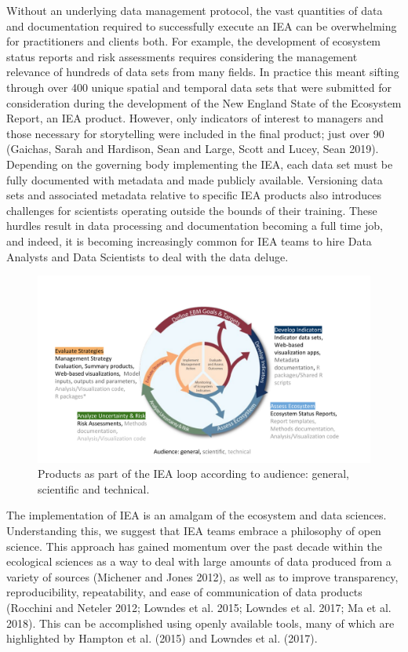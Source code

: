 \documentclass[
]{article}
\begin{document}
Without an underlying data management protocol, the vast quantities of
data and documentation required to successfully execute an IEA can be
overwhelming for practitioners and clients both. For example, the
development of ecosystem status reports and risk assessments requires
considering the management relevance of hundreds of data sets from many
fields. In practice this meant sifting through over 400 unique spatial
and temporal data sets that were submitted for consideration during the
development of the New England State of the Ecosystem Report, an IEA
product. However, only indicators of interest to managers and those
necessary for storytelling were included in the final product; just over
90 (Gaichas, Sarah and Hardison, Sean and Large, Scott and Lucey, Sean
2019). Depending on the governing body implementing the IEA, each data
set must be fully documented with metadata and made publicly available.
Versioning data sets and associated metadata relative to specific IEA
products also introduces challenges for scientists operating outside the
bounds of their training. These hurdles result in data processing and
documentation becoming a full time job, and indeed, it is becoming
increasingly common for IEA teams to hire Data Analysts and Data
Scientists to deal with the data deluge.

\begin{figure}
  \centering
  \includegraphics[width=1.0\textwidth]{./images/products-loop.pdf}
  \caption{Products as part of the IEA loop according to audience: general, scientific and technical.}
  \label{fig:products-loop}
\end{figure}

The implementation of IEA is an amalgam of the ecosystem and data
sciences. Understanding this, we suggest that IEA teams embrace a
philosophy of open science. This approach has gained momentum over the
past decade within the ecological sciences as a way to deal with large
amounts of data produced from a variety of sources (Michener and Jones
2012), as well as to improve transparency, reproducibility,
repeatability, and ease of communication of data products (Rocchini and
Neteler 2012; Lowndes et al. 2015; Lowndes et al. 2017; Ma et al. 2018).
This can be accomplished using openly available tools, many of which are
highlighted by Hampton et al. (2015) and Lowndes et al. (2017).
\end{document}
